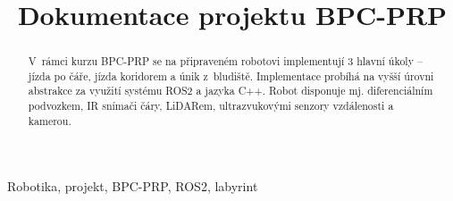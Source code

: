 \documentclass[conference]{IEEEtran}
\begin{document}
\title{Dokumentace projektu BPC-PRP}

\author{
\and
{}
}

\maketitle

\begin{abstract}
V~rámci kurzu BPC-PRP se na připraveném robotovi implementují 3 hlavní úkoly – jízda po čáře, jízda koridorem a únik z~bludiště. Implementace probíhá na vyšší úrovni abstrakce za využití systému ROS2 a jazyka C++. Robot disponuje mj. diferenciálním podvozkem, IR snímači čáry, LiDARem, ultrazvukovými senzory vzdálenosti a kamerou.
\end{abstract}

\renewcommand\IEEEkeywordsname{Klíčová slova}
\begin{IEEEkeywords}
Robotika, projekt, BPC-PRP, ROS2, labyrint
\end{IEEEkeywords}







\printbibliography
\end{document}
